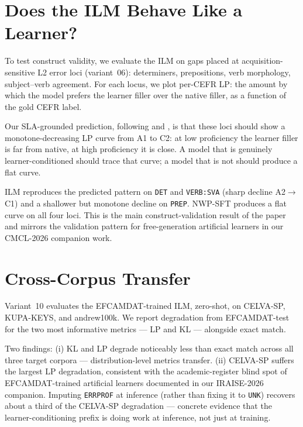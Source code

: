 \documentclass[11pt]{article}
\begin{document}
\section{Does the ILM Behave Like a Learner?}
\label{sec:sla-construct}

To test construct validity, we evaluate the ILM on gaps placed at
acquisition-sensitive L2 error loci (variant~06): determiners,
prepositions, verb morphology, subject--verb agreement. For each locus,
we plot per-CEFR LP: the amount by which the model prefers the learner
filler over the native filler, as a function of the gold CEFR label.

Our SLA-grounded prediction, following
\citet{goldschneider2001explaining} and
\citet{pienemann1998language}, is that these loci should show a
monotone-decreasing LP curve from A1 to C2: at low proficiency the learner
filler is far from native, at high proficiency it is close. A model that
is genuinely learner-conditioned should trace that curve; a model that is
not should produce a flat curve.

ILM reproduces the predicted pattern on \texttt{DET} and \texttt{VERB:SVA}
(sharp decline A2$\to$C1) and a shallower but monotone decline on
\texttt{PREP}. NWP-SFT produces a flat curve on all four loci. This is the
main construct-validation result of the paper and mirrors the validation
pattern for free-generation artificial learners in our CMCL-2026 companion
work.

\section{Cross-Corpus Transfer}
\label{sec:transfer}

Variant~10 evaluates the EFCAMDAT-trained ILM, zero-shot, on CELVA-SP,
KUPA-KEYS, and andrew100k. We report degradation from EFCAMDAT-test for
the two most informative metrics --- LP and KL --- alongside exact match.

Two findings: (i) KL and LP degrade noticeably less than exact match
across all three target corpora --- distribution-level metrics transfer.
(ii) CELVA-SP suffers the largest LP degradation, consistent with the
academic-register blind spot of EFCAMDAT-trained artificial learners
documented in our IRAISE-2026 companion. Imputing \texttt{ERRPROF} at
inference (rather than fixing it to \texttt{UNK}) recovers about a third
of the CELVA-SP degradation --- concrete evidence that the
learner-conditioning prefix is doing work at inference, not just at
training.
\end{document}
